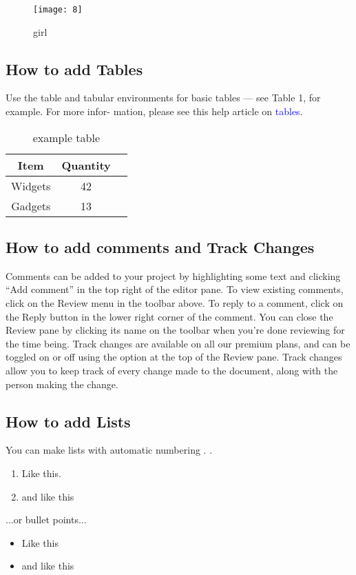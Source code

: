 \documentclass{article}
\begin{document}
\begin{figure}[h]
	\centering
	\texttt{[image: 8]}
	\caption{girl}
	\label{fig:8}
\end{figure}
	\subsection{How to add Tables}
	Use the table and tabular environments for basic tables — see Table 1, for example. For more infor-
	mation, please see this help article on \textcolor{blue}{tables}.
	\begin{table}
	\centering
	\begin{tabular}{|c|c|c|}
		\hline
		Item & Quantity \\
		\hline
		Widgets & 42\\
		\hline
		Gadgets & 13 \\
		\hline
	\end{tabular}
   \caption{example table}
	\end{table}
	\subsection{How to add comments and Track Changes}
	Comments can be added to your project by highlighting some text and clicking “Add comment” in
	the top right of the editor pane. To view existing comments, click on the Review menu in the toolbar
	above. To reply to a comment, click on the Reply button in the lower right corner of the comment.
	You can close the Review pane by clicking its name on the toolbar when you’re done reviewing for the
	time being.
	Track changes are available on all our premium plans, and can be toggled on or off using the option
	at the top of the Review pane. Track changes allow you to keep track of every change made to the
	document, along with the person making the change.
	\subsection{How to add Lists}
	You can make lists with automatic numbering . .
	\begin{enumerate}
   \item Like this.
   \item and like this
   \end{enumerate}
   ...or bullet points...
   \begin{itemize}
  \item Like this
  \item and like this 
\end{itemize}
\end{document}
